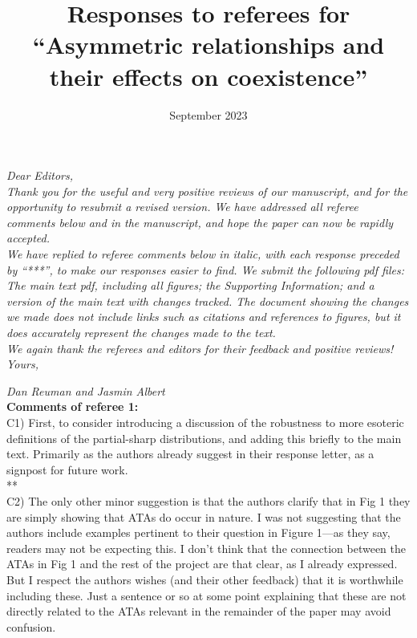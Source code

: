 \documentclass[letterpaper,11pt]{article}
\title{Responses to referees for ``Asymmetric relationships and their effects on coexistence''}
\date{September 2023}
\begin{document}
\noindent \emph{Dear Editors,} \\

\noindent \emph{Thank you for the useful and very positive reviews of our manuscript, and for
the opportunity to resubmit a revised version. We have addressed all referee comments below and in
the manuscript, and hope the paper can now be rapidly accepted. } \\

\noindent \emph{We have replied to referee comments below in italic, with each response preceded
by ``***'', to make our responses easier to find. We submit the following pdf files: The main text pdf, including all figures; 
the Supporting Information; and a version of the main text with changes tracked. The document showing 
the changes we made does not include links such as citations and
references to figures, but it does accurately represent the changes made to the text.} \\

\noindent \emph{We again thank the referees and editors for their feedback and positive reviews!} \\

\noindent \emph{Yours,}

\noindent \emph{Dan Reuman and Jasmin Albert} \\

\noindent \textbf{Comments of referee 1:} \\

\noindent C1) First, to consider introducing a discussion of the robustness to more esoteric definitions of the partial-sharp distributions, and adding this briefly to the main text.  Primarily as the authors already suggest in their response letter, as a signpost for future work.\\

\noindent ***\emph{} \\

\noindent C2) The only other minor suggestion is that the authors clarify that in Fig 1 they are simply showing that ATAs do occur in nature.  I was not suggesting that the authors include examples pertinent to their question in Figure 1---as they say, readers may not be expecting this. I don't think that the connection between the ATAs in Fig 1 and the rest of the project are that clear, as I already expressed. But I respect the authors wishes (and their other feedback) that it is worthwhile including these. Just a sentence or so at some point explaining that these are not directly related to the ATAs relevant in the remainder of the paper may avoid confusion. \\
\end{document}
